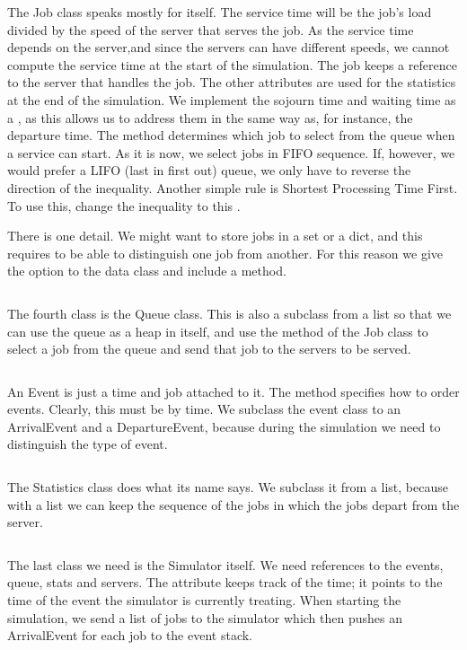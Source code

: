 \documentclass[queueing-book.tex]{subfiles}
\begin{document}
The Job class speaks mostly for itself.
The service time will be the job's load divided by the speed of the server that serves the job.
As the service time depends on the server,and since the servers can have different speeds, we cannot compute the service time at the start of the simulation.
The job keeps a reference to the server that handles the job.
The other attributes are used for the statistics at the end of the simulation.
We implement the sojourn time and waiting time as a , as this allows us to address them in the same way as, for instance, the departure time.
The  method determines which job to select from the queue when a service can start.
As it is now, we select jobs in FIFO sequence.
If, however, we would prefer a LIFO (last in first out) queue, we only have to reverse the direction of the inequality. Another simple rule is Shortest Processing Time First. To use this,  change the inequality to this .

There is one detail.
We might want to store jobs in a set or a dict, and this requires to be able to distinguish one job from another.
For this reason we give the option  to the data class and include a  method.
\inputminted[label=job.py]{python}{../code/event_stacks/job.py}

The fourth class is the Queue class.
This is also a subclass from a list so that we can use the queue as a heap in itself, and use the  method of the Job class to select a job from the queue and send that job to the servers to be served.
\inputminted[label=queues.py]{python}{../code/event_stacks/queues.py}

An Event is just a time and job attached to it. The  method specifies how to order events. Clearly, this must be by time.
We subclass the event class to an ArrivalEvent and a DepartureEvent, because during the simulation we need to distinguish the type of event.
\inputminted[label=event.py]{python}{../code/event_stacks/event.py}

The Statistics class does what its name says.
We subclass it from a list, because with a list we can keep the sequence of the jobs in which the jobs depart from the server.
\inputminted[label=stats.py]{python}{../code/event_stacks/stats.py}


The last class we need is the Simulator itself.
We need references to the events, queue, stats and servers.
The attribute  keeps track of the time; it points to the time of the event the simulator is currently treating.
When starting the simulation, we send a list of jobs to the simulator which then pushes an ArrivalEvent for each job to the event stack.
\end{document}
